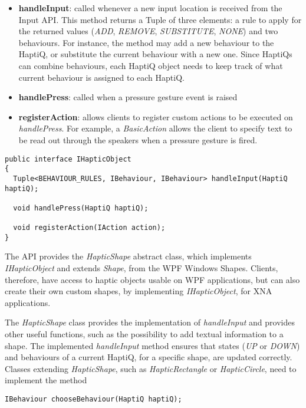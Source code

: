 \begin{itemize}
	\item \textbf{handleInput}: called whenever a new input location is received from the Input API. This method returns a Tuple of three elements: a rule to apply for the returned values (\textit{ADD}, \textit{REMOVE}, \textit{SUBSTITUTE}, \textit{NONE}) and two behaviours. For instance, the method may add a new behaviour to the HaptiQ, or substitute the current behaviour with a new one. Since HaptiQs can combine behaviours, each HaptiQ object needs to keep track of what current behaviour is assigned to each HaptiQ. 
    \item \textbf{handlePress}: called when a pressure gesture event is raised
    \item \textbf{registerAction}: allows clients to register custom actions to be executed on \textit{handlePress}. For example, a \textit{BasicAction} allows the client to specify text to be read out through the speakers when a pressure gesture is fired.
\end{itemize}

\lstset{style=sharpc1}
\begin{lstlisting}[caption={IHapticObject},label={lst:IHapticObject}]
public interface IHapticObject 
{
  Tuple<BEHAVIOUR_RULES, IBehaviour, IBehaviour> handleInput(HaptiQ haptiQ);
  
  void handlePress(HaptiQ haptiQ);
  
  void registerAction(IAction action);
}
\end{lstlisting}

The API provides the \textit{HapticShape} abstract class, which implements \textit{IHapticObject} and extends \textit{Shape}, from the WPF Windows Shapes. Clients, therefore, have access to haptic objects usable on WPF applications, but can also create their own custom shapes, by implementing \textit{IHapticObject}, for XNA applications. 

The \textit{HapticShape} class provides the implementation of \textit{handleInput} and provides other useful functions, such as the possibility to add textual information to a shape. The implemented \textit{handleInput} method ensures that states (\textit{UP} or \textit{DOWN}) and behaviours of a current HaptiQ, for a specific shape, are updated correctly. Classes extending \textit{HapticShape}, such as \textit{HapticRectangle} or \textit{HapticCircle}, need to implement the method

\lstset{style=sharpc1}
\begin{lstlisting}
IBehaviour chooseBehaviour(HaptiQ haptiQ);
\end{lstlisting}

